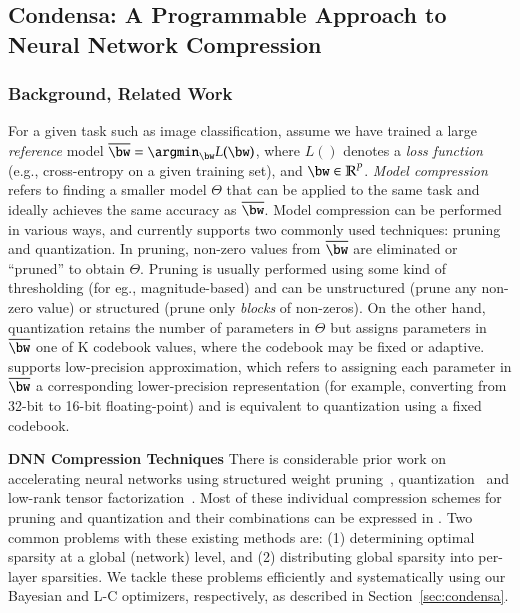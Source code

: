 \subsection{Condensa: A Programmable Approach to Neural Network Compression}
\subsubsection{Background, Related Work}

For a given task such as image classification, assume we have trained a large {\em reference} model $\overline{\bw} = \argmin_{\bw} L(\bw)$, where $L()$ denotes a {\em loss function} (e.g., cross-entropy on a given training set), and $\bw \in \mathbb{R}^P$. {\em Model compression} refers to finding a smaller model $\Theta$ that can be applied to the same task and ideally achieves the same accuracy as $\overline{\bw}$.
Model compression can be performed in various ways, and \algoName currently supports two commonly used techniques: pruning and quantization. In pruning, non-zero values from $\overline{\bw}$ are eliminated or ``pruned'' to obtain $\Theta$. Pruning is usually performed using some kind of thresholding (for eg., magnitude-based) and can be unstructured (prune any non-zero value) or structured (prune only {\em blocks} of non-zeros). On the other hand, quantization retains the number of parameters in $\Theta$ but assigns parameters in $\overline{\bw}$ one of K codebook values, where the codebook may be fixed or adaptive. \algoName supports low-precision approximation, which refers to assigning each parameter in $\overline{\bw}$ a corresponding lower-precision representation (for example, converting from 32-bit to 16-bit floating-point) and is equivalent to quantization using a fixed codebook.


\noindent \textbf{DNN Compression Techniques}
There is considerable prior work on accelerating neural networks using structured 
weight pruning~\cite{wang2019structured,mccarley2020structured,frankle2018lottery, han2015learning, luo2017thinet, han2017ese, dong2017more, han2016eie, polyak2015channel, hu2016network, anwar2016compact, molchanov2016pruning}, quantization~\cite{zhu2016trained, gong2014compressing} and 
low-rank tensor factorization~\cite{kossaifi2020factorized,lebedev2014speeding, xue2013restructuring, denton2014exploiting, girshick2015fast}.
Most of these individual compression
schemes for pruning and quantization and their combinations can be expressed in \algoName. Two common problems with these existing methods are: (1) determining optimal sparsity at a global (network) level, and (2) distributing global sparsity into per-layer sparsities.
We tackle these problems efficiently and systematically using our Bayesian and L-C optimizers, respectively, as described in Section~\ref{sec:condensa}.

